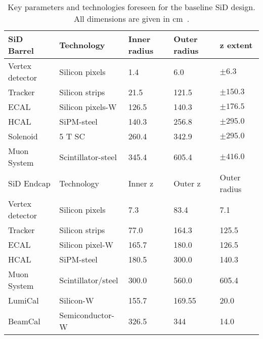 \begin{table}[h!]
\caption[Key parameters of the baseline SiD design]{Key parameters and technologies foreseen for the baseline SiD design. All dimensions are given in cm~\cite{SiD_Geo}.}
\label{tab:KeyParametersSiD}
\centering
\begin{tabularx}{0.81\textwidth}{l|llll}
\hline\hline
SiD Barrel & Technology & Inner radius & Outer radius & z extent\\
\hline
Vertex detector & Silicon pixels & 1.4 & 6.0 & $\pm 6.3$ \\
Tracker & Silicon strips & 21.5 & 121.5 & $\pm 150.3$ \\
ECAL & Silicon pixels-W & 126.5 & 140.3 & $\pm 176.5$ \\
HCAL & SiPM-steel & 140.3 & 256.8 & $\pm 295.0$ \\
Solenoid & 5 T SC & 260.4 & 342.9 & $\pm 295.0$ \\
Muon System & Scintillator-steel & 345.4 & 605.4 & $\pm 416.0$ \\
\hline
SiD Endcap & Technology & Inner z & Outer z & Outer radius\\
\hline
Vertex detector & Silicon pixels & 7.3 & 83.4 & 7.1 \\
Tracker & Silicon strips & 77.0 & 164.3 & 125.5 \\
ECAL & Silicon pixel-W & 165.7 & 180.0 & 126.5 \\
HCAL & SiPM-steel & 180.5 & 300.0 & 140.3 \\
Muon System & Scintillator/steel & 300.0 & 560.0 & 605.4 \\
LumiCal & Silicon-W & 155.7 & 169.55 &  20.0 \\
BeamCal & Semiconductor-W & 326.5 & 344 & 14.0 \\
\hline\hline
\end{tabularx}
\end{table}

\newpage
